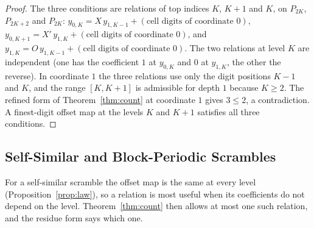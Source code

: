 \begin{proof}
The three conditions are relations of top indices $K$, $K+1$ and $K$, on $P_{2K}$, $P_{2K+2}$ and $P_{2K}$: $y_{0,K}=X\,y_{1,K-1}+(\text{cell digits of coordinate }0)$, $y_{0,K+1}=X'\,y_{1,K}+(\text{cell digits of coordinate }0)$, and $y_{1,K}=O\,y_{1,K-1}+(\text{cell digits of coordinate }0)$. The two relations at level $K$ are independent (one has the coefficient $1$ at $y_{0,K}$ and $0$ at $y_{1,K}$, the other the reverse). In coordinate $1$ the three relations use only the digit positions $K-1$ and $K$, and the range $[K,K+1]$ is admissible for depth $1$ because $K\ge2$. The refined form of Theorem~\ref{thm:count} at coordinate $1$ gives $3\le2$, a contradiction. A finest-digit offset map at the levels $K$ and $K+1$ satisfies all three conditions.
\end{proof}

\subsection{Self-Similar and Block-Periodic Scrambles}\label{sec:countselfsim}
For a self-similar scramble the offset map is the same at every level (Proposition~\ref{prop:law}), so a relation is most useful when its coefficients do not depend on the level. Theorem~\ref{thm:count} then allows at most one such relation, and the residue form says which one.


